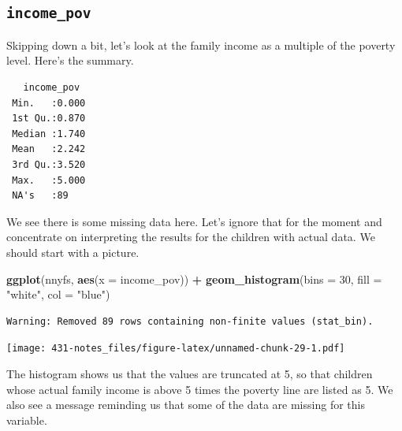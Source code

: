 \documentclass[
]{book}
\newenvironment{Shaded}{\begin{snugshade}}{\end{snugshade}}
\newcommand{\DataTypeTok}[1]{\textcolor[rgb]{0.13,0.29,0.53}{#1}}
\newcommand{\DecValTok}[1]{\textcolor[rgb]{0.00,0.00,0.81}{#1}}
\newcommand{\KeywordTok}[1]{\textcolor[rgb]{0.13,0.29,0.53}{\textbf{#1}}}
\newcommand{\NormalTok}[1]{#1}
\newcommand{\OperatorTok}[1]{\textcolor[rgb]{0.81,0.36,0.00}{\textbf{#1}}}
\newcommand{\StringTok}[1]{\textcolor[rgb]{0.31,0.60,0.02}{#1}}
\begin{document}
\hypertarget{income_pov}{%
\subsection{\texorpdfstring{\texttt{income\_pov}}{income\_pov}}\label{income_pov}}

Skipping down a bit, let's look at the family income as a multiple of the poverty level. Here's the summary.

\begin{Shaded}
\end{Shaded}

\begin{verbatim}
   income_pov   
 Min.   :0.000  
 1st Qu.:0.870  
 Median :1.740  
 Mean   :2.242  
 3rd Qu.:3.520  
 Max.   :5.000  
 NA's   :89     
\end{verbatim}

We see there is some missing data here. Let's ignore that for the moment and concentrate on interpreting the results for the children with actual data. We should start with a picture.

\begin{Shaded}
\begin{Highlighting}[]
\KeywordTok{ggplot}\NormalTok{(nnyfs, }\KeywordTok{aes}\NormalTok{(}\DataTypeTok{x =}\NormalTok{ income_pov)) }\OperatorTok{+}
\StringTok{  }\KeywordTok{geom_histogram}\NormalTok{(}\DataTypeTok{bins =} \DecValTok{30}\NormalTok{, }\DataTypeTok{fill =} \StringTok{"white"}\NormalTok{, }\DataTypeTok{col =} \StringTok{"blue"}\NormalTok{)}
\end{Highlighting}
\end{Shaded}

\begin{verbatim}
Warning: Removed 89 rows containing non-finite values (stat_bin).
\end{verbatim}

\texttt{[image: 431-notes\_files/figure-latex/unnamed-chunk-29-1.pdf]}

The histogram shows us that the values are truncated at 5, so that children whose actual family income is above 5 times the poverty line are listed as 5. We also see a message reminding us that some of the data are missing for this variable.
\end{document}
